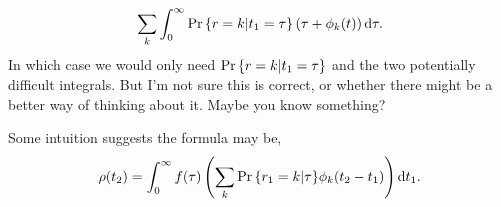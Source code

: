 $$\sum_k \int_0^\infty {\text{Pr}\left\{r = k| t_1 = \tau\right\}}\left(\tau + \phi_k(t)\right) {\rm d} \tau.$$
In which case we would only need ${\text{Pr}\left\{r = k| t_1 = \tau\right\}}$ and the two potentially difficult integrals. But I'm not sure this is correct, or whether there might be a better way of thinking about it. Maybe you know something?\par

\vspace{5pt}

Some intuition suggests the formula may be,    
$$\rho(t_2) = \int^{\infty}_0 f(\tau)\left(\sum_k {\text{Pr}\left\{r_1 = k|\tau\right\}} \phi_k(t_2 - t_1)  \right) {\rm d} t_1.$$

